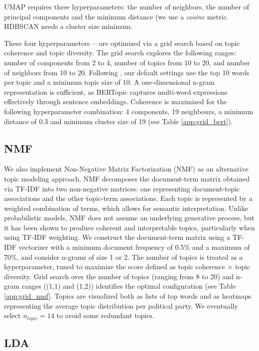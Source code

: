 \documentclass{article}
\begin{document}
UMAP requires three hyperparameters: the number of neighbors, the number of principal components and the minimum distance (we use a \textit{cosine} metric. HDBSCAN needs a cluster size minimum.

These four hyperparameters —are optimized via a grid search based on topic coherence and topic diversity. The grid search explores the following ranges: number of components from 2 to 4, number of topics from 10 to 20, and number of neighbors from 10 to 20. Following \citet{orellana2023nlp}, our default settings use the top 10 words per topic and a minimum topic size of 10. A one-dimensional n-gram representation is sufficient, as BERTopic captures multi-word expressions effectively through sentence embeddings. Coherence is maximized for the following hyperparameter combination: 4 components, 19 neighbours, a minimum distance of 0.3 and minimum cluster size of 19  (see Table \ref{app:grid_bert}).

\subsection{NMF}

We also implement Non-Negative Matrix Factorization (NMF) as an alternative topic modeling approach. NMF decomposes the document-term matrix obtained via TF-IDF into two non-negative matrices: one representing document-topic associations and the other topic-term associations. Each topic is represented by a weighted combination of terms, which allows for semantic interpretation. Unlike probabilistic models, NMF does not assume an underlying generative process, but it has been shown to produce coherent and interpretable topics, particularly when using TF-IDF weighting. We construct the document-term matrix using a TF-IDF vectorizer with a minimum document frequency of 0.5\% and a maximum of 70\%, and consider n-grams of size 1 or 2. The number of topics is treated as a hyperparameter, tuned to maximize the score defined as topic coherence $\times$ topic diversity. Grid search over the number of topics (ranging from 8 to 20) and n-gram ranges ((1,1) and (1,2)) identifies the optimal configuration (see Table \ref{app:grid_nmf}. Topics are visualized both as lists of top words and as heatmaps representing the average topic distribution per political party. We eventually select $n_{topic} = 14$ to avoid some redundant topics.

\subsection{LDA}
\end{document}

